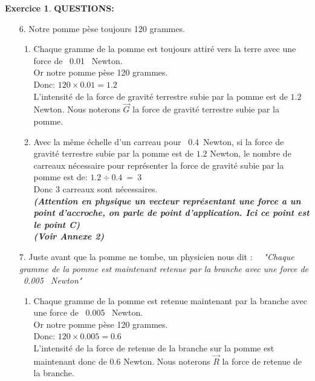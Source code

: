 \documentclass[a4paper,10.9pt]{article}
\theoremstyle{definition}
\newtheorem{exo}{Exercice}
\begin{document}
\begin{exo}
\textbf{QUESTIONS:}\\
\begin{enumerate}
	\item[6.] Notre pomme pèse toujours 120 grammes.\\
	\begin{enumerate}
		\item Chaque gramme de la pomme est toujours attiré vers la terre avec une force de ~0.01~ Newton.\\ 
		Or notre pomme pèse 120 grammes.\\
		Donc: \quad $120 \times 0.01 = 1.2$\\
		L'intensité de la force de gravité terrestre subie par la pomme est de $1.2$ Newton. Nous noterons $\vec{G}$ la force de gravité terrestre subie par la pomme.\\
		\item Avec la même échelle d'un carreau pour ~0.4~Newton, si la force de gravité terrestre subie par la pomme est de $1.2$ Newton, le nombre de carreaux nécessaire pour représenter la force de gravité subie par la pomme est de: \quad $1.2 \div 0.4 \ = \ 3$\\
		Donc $3$ carreaux sont nécessaires.
		\\ \textit{\textbf{(Attention en physique un vecteur représentant une force a un point d'accroche, on parle de point d'application. Ici ce point est le point C)}}\\ \textbf{\textit{(Voir Annexe 2)}}\\
	\end{enumerate} 
	\item[7.] Juste avant que la pomme ne tombe, un physicien nous dit : ~~\textit{"Chaque gramme de la pomme est maintenant retenue par la branche avec une force de ~0.005~ Newton"}\\ 
	\begin{enumerate}
		\item Chaque gramme de la pomme est retenue maintenant par la branche avec une force de ~0.005~ Newton.\\
		Or notre pomme pèse 120 grammes.\\
		Donc: \quad $120 \times 0.005 = 0.6$\\
		L'intensité de la force de retenue de la branche sur la pomme est maintenant  donc de $0.6$ Newton. Nous noterons $\vec{R}$ la force de retenue de la branche.\\
	

\end{enumerate}
\end{enumerate}
\end{exo}
\end{document}
